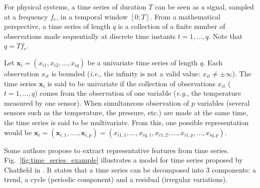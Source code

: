 For physical systems, a time series of duration $T$ can be seen as a signal, sampled at a frequency $f_e$, in a temporal window $[0;T]$. From a mathematical perspective, a time series of length $q$ is a collection of a finite number of observations made sequentially at discrete time instants $t=1,...,q$. Note that $q=Tf_e$. 

Let $\textbf{x}_i=(x_{i1}, x_{i2}, ..., x_{iq})$ be a univariate time series of length $q$. Each observation $x_{it}$ is bounded (\textit{i.e.}, the infinity is not a valid value: $x_{it} \neq \pm \infty$). The time series $\textbf{x}_i$ is said to be univariate if the collection of observations $x_{it}$ ($t=1,...,q$) comes from the observation of one variable (\textit{e.g.}, the temperature measured by one sensor). When simultaneous observation of $p$ variables (several sensors such as the temperature, the pressure, etc.) are made at the same time, the time series is said to be multivariate. From this, one possible representation would be $\textbf{x}_i=(\textbf{x}_{i,1}, ...., \textbf{x}_{i,p})=(x_{i1,1}, ..., x_{iq,1},x_{i1,2}, ..., x_{i1,p}, ..., x_{iq,p})$.

%

Some authors propose to extract representative features from time series. Fig.~\ref{fig:time_series_example} illustrates a model for time series proposed by Chatfield in \cite{Chatfield2004}. It states that a time series can be decomposed into 3 components: a trend, a cycle (periodic component) and a residual (irregular variations). 

